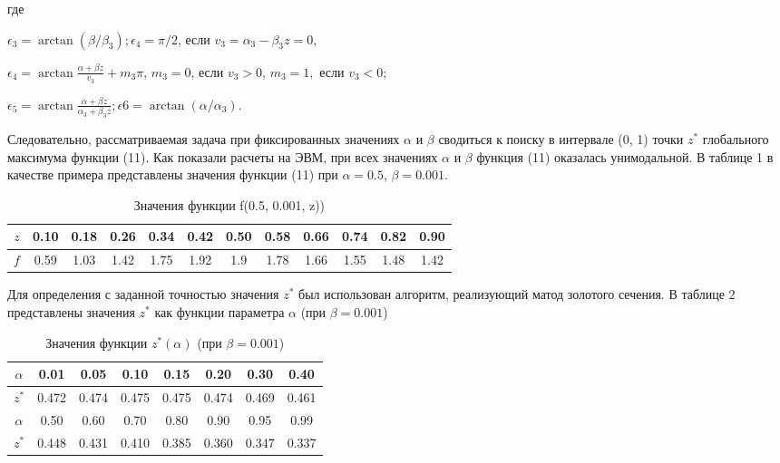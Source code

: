 \documentclass[a4paper, 12pt]{article}
\begin{document}
где 

$\epsilon_3=\arctan(\beta/\beta_3); \epsilon_4=\pi/2$, если $v_3=\alpha_3-\beta_3z=0,$

$\epsilon_4=\arctan\frac{\alpha+\beta z}{v_3}+m_3\pi$, $m_3=0$, если $v_3>0$, $m_3=1,$ если $v_3<0$;

$\epsilon_5=\arctan\frac{\alpha+\beta z}{\alpha_3+\beta_3 z}; \epsilon6=\arctan(\alpha/\alpha_3)$.

Следовательно, рассматриваемая задача при фиксированных значениях $\alpha$ и $\beta$ сводиться к поиску в интервале (0, 1) точки $z^*$ глобального максимума функции (11). Как показали расчеты на ЭВМ, при всех значениях $\alpha$ и $\beta$ функция (11) оказалась унимодальной. В таблице 1 в качестве примера представлены значения  функции (11) при $\alpha=0.5$, $\beta=0.001$.

\begin{table}[h]
\caption{Значения функции f(0.5, 0.001, z))}
\begin{tabular}{| c | c | c | c | c | c | c | c | c | c | c | c |}
	\hline
	$z$ & 0.10 & 0.18 & 0.26 & 0.34 & 0.42 & 0.50 & 0.58 & 0.66 & 0.74 & 0.82 & 0.90 \\
	\hline
	$f$ & 0.59 & 1.03 & 1.42 & 1.75 & 1.92 & 1.9 & 1.78 & 1.66 & 1.55 & 1.48 & 1.42 \\
	\hline
\end{tabular}
\end{table}

Для определения с заданной точностью значения $z^*$ был использован алгоритм, реализующий матод золотого сечения. В таблице 2 представлены значения $z^*$ как функции параметра $\alpha$ (при $\beta=0.001$)

\begin{table}[h]
\caption{Значения функции $z^*(\alpha)$ (при $\beta=0.001$)}
\begin{tabular}{| c | c | c | c | c | c | c | c |}
	\hline
	$\alpha$ & 0.01 & 0.05 & 0.10 & 0.15 & 0.20 & 0.30 & 0.40 \\
	\hline
	$z^*$ & 0.472 & 0.474 & 0.475 & 0.475 & 0.474 & 0.469 & 0.461 \\
	\hline
	$\alpha$ & 0.50 & 0.60 & 0.70 & 0.80 & 0.90 & 0.95 & 0.99 \\
	\hline
	$z^*$ & 0.448 & 0.431 & 0.410 & 0.385 & 0.360 & 0.347 & 0.337 \\
	\hline
\end{tabular}
\end{table}
\end{document}
